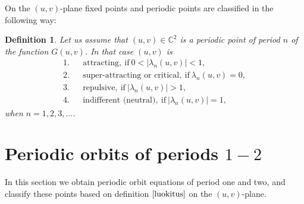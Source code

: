 \documentclass[12pt,a4paper]{amsart}
\newtheorem{maar}[lause]{Definition}
\numberwithin{equation}{section}
\numberwithin{lause}{section}
\begin{document}
On the $(u,v)$-plane fixed points and periodic points are classified in the following way:
\begin{maar} \label{luokitus}
Let us assume that $(u,v) \in \mathbb{C}^{2}$ is a periodic point of period $n$ of the function $G(u,v)$. In that case
$(u,v)$ is
\begin{eqnarray*}
1.&&  \textrm{attracting}, \ \textrm{if} \ 0<|\lambda_{n}(u,v)|<1, \\ \nonumber
2.&&  \textrm{super-attracting or critical}, \ \textrm{if} \ \lambda_{n}(u,v)=0, \\ \nonumber
3.&&  \textrm{repulsive}, \ \textrm{if} \ |\lambda_{n}(u,v)|>1, \\ \nonumber
4.&&  \textrm{indifferent (neutral)}, \ \textrm{if} \ |\lambda_{n}(u,v)|=1, \nonumber
\end{eqnarray*}
when $n=1,2,3, \ldots$.
 \end{maar}


\section{Periodic orbits of periods $1-2$}


In this section we obtain periodic orbit equations of period one and two, and classify these points based on definition $\ref{luokitus}$ on the $(u,v)$-plane.
\end{document}
